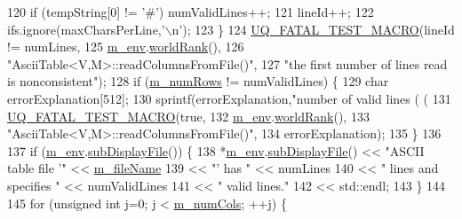 \begin{DoxyCode}
120     \textcolor{keywordflow}{if} (tempString[0] != \textcolor{charliteral}{'#'}) numValidLines++;
121     lineId++;
122     ifs.ignore(maxCharsPerLine,\textcolor{charliteral}{'\(\backslash\)n'});
123   \}
124   \hyperlink{_defines_8h_a56d63d18d0a6d45757de47fcc06f574d}{UQ\_FATAL\_TEST\_MACRO}(lineId != numLines,
125                       \hyperlink{class_q_u_e_s_o_1_1_ascii_table_a2ba907db652aa02d53d493980d7a3753}{m\_env}.\hyperlink{class_q_u_e_s_o_1_1_base_environment_a78b57112bbd0e6dd0e8afec00b40ffa7}{worldRank}(),
126                       \textcolor{stringliteral}{"AsciiTable<V,M>::readColumnsFromFile()"},
127                       \textcolor{stringliteral}{"the first number of lines read is nonconsistent"});
128   \textcolor{keywordflow}{if} (\hyperlink{class_q_u_e_s_o_1_1_ascii_table_a4f772a7719d36cb0a0908eed37bd1deb}{m\_numRows} != numValidLines) \{
129     \textcolor{keywordtype}{char} errorExplanation[512];
130     sprintf(errorExplanation,\textcolor{stringliteral}{"number of valid lines (%
       (%
131     \hyperlink{_defines_8h_a56d63d18d0a6d45757de47fcc06f574d}{UQ\_FATAL\_TEST\_MACRO}(\textcolor{keyword}{true},
132                         \hyperlink{class_q_u_e_s_o_1_1_ascii_table_a2ba907db652aa02d53d493980d7a3753}{m\_env}.\hyperlink{class_q_u_e_s_o_1_1_base_environment_a78b57112bbd0e6dd0e8afec00b40ffa7}{worldRank}(),
133                         \textcolor{stringliteral}{"AsciiTable<V,M>::readColumnsFromFile()"},
134                         errorExplanation);
135   \}
136 
137   \textcolor{keywordflow}{if} (\hyperlink{class_q_u_e_s_o_1_1_ascii_table_a2ba907db652aa02d53d493980d7a3753}{m\_env}.\hyperlink{class_q_u_e_s_o_1_1_base_environment_a8a0064746ae8dddfece4229b9ad374d6}{subDisplayFile}()) \{
138     *\hyperlink{class_q_u_e_s_o_1_1_ascii_table_a2ba907db652aa02d53d493980d7a3753}{m\_env}.\hyperlink{class_q_u_e_s_o_1_1_base_environment_a8a0064746ae8dddfece4229b9ad374d6}{subDisplayFile}() << \textcolor{stringliteral}{"ASCII table file '"}    << 
      \hyperlink{class_q_u_e_s_o_1_1_ascii_table_adb7e4bac907ef1c93d745f02ea9f15d2}{m\_fileName}
139                             << \textcolor{stringliteral}{"' has "}                << numLines
140                             << \textcolor{stringliteral}{" lines and specifies "} << numValidLines
141                             << \textcolor{stringliteral}{" valid lines."}
142                             << std::endl;
143   \}
144 
145   \textcolor{keywordflow}{for} (\textcolor{keywordtype}{unsigned} \textcolor{keywordtype}{int} j=0; j < \hyperlink{class_q_u_e_s_o_1_1_ascii_table_ada886c8db06d2d618f2898ad2cf2bd87}{m\_numCols}; ++j) \{
}
\end{DoxyCode}
